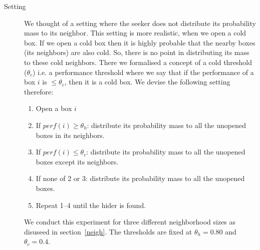 \documentclass[11pt,a4paper,draft]{article}
\begin{document}
\begin{description}
	\item[Setting] We thought of a setting where the seeker does not distribute its probability mass to its neighbor. This setting is more realistic, when we open a cold box. If we open a cold box then it is highly probable that the nearby boxes (its neighbors) are also cold. So, there is no point in distributing its mass to these cold neighbors. There we formalised a concept of a cold threshold ($\theta_c$) i.e. a performance threshold where we say that if the performance of a box $i$ is $\leq \theta_c$, then it is a cold box. We devise the following setting therefore:
	\begin{enumerate}
		\item Open a box $i$
		\item If $perf(i) \geq \theta_h$: distribute its probability mass to all the unopened boxes in its neighbors. 
		\item If $perf(i) \leq \theta_c$: distribute its probability mass to all the unopened boxes except its neighbors.
		\item If none of 2 or 3: distribute its probability mass to all the unopened boxes.
		\item Repeat 1--4 until the hider is found.
	\end{enumerate}
	We conduct this experiment for three different neighborhood sizes as disuseed in section~\ref{neigh}. The thresholds are fixed at $\theta_h = 0.80$ and $\theta_c = 0.4$.
	

\end{description}
\end{document}
